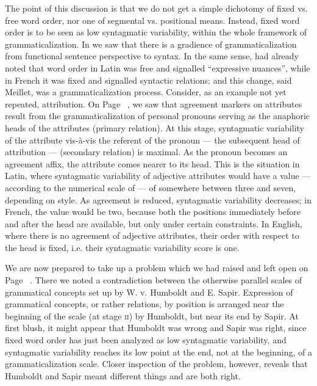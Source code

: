 The point of this discussion is that we do not get a simple dichotomy of fixed vs. free word order, nor one of segmental vs. positional means. Instead, fixed word order is to be seen as low syntagmatic variability, within the whole framework of grammaticalization. In  we saw that there is a gradience of grammaticalization from functional sentence perspective to syntax. In the same sense, \citet[147f]{Meillet1912} had already noted that word order in Latin was free and signalled “expressive nuances”, while in French it was fixed and signalled syntactic relations; and this change, said Meillet, was a grammaticalization process. Consider, as an example not yet repeated, attribution. On Page~\pageref{page77}\chk%
, we saw that agreement markers on attributes result from the grammaticalization of personal pronouns serving as the anaphoric heads of the attributes (primary relation). At this stage, syntagmatic variability of the attribute vis-à-vis the referent of the pronoun — the subsequent head of attribution — (secondary relation) is maximal. As the pronoun becomes an agreement affix, the attribute comes nearer to its head. This is the situation in Latin, where syntagmatic variability of adjective attributes would have a value — according to the numerical scale of  — of somewhere between three and seven, depending on style. As agreement is reduced, syntagmatic variability decreases; in French, the value would be two, because both the positions immediately before and after the head are available, but only under certain constraints. In English, where there is no agreement of adjective attributes, their order with respect to the head is fixed, i.e. their syntagmatic variability score is one.

We are now prepared to take up a problem which we had raised and left open on Page~\pageref{page6}\chk%
. There we noted a contradiction between the otherwise parallel scales of grammatical concepts set up by W. v. Humboldt and E. Sapir. Expression of grammatical concepts, or rather relations, by position is arranged near the beginning of the scale (at stage \textsc{ii}) by Humboldt, but near its end by Sapir. At first blush, it might appear that Humboldt was wrong and Sapir was right, since fixed word order has just been analyzed as low syntagmatic variability, and syntagmatic variability reaches its low point at the end, not at the beginning, of a grammaticalization scale. Closer inspection of the problem, however, reveals that Humboldt and Sapir meant different things and are both right.


